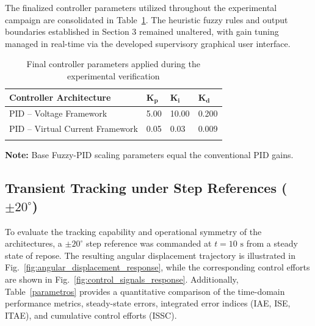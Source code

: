 \documentclass[pdflatex,sn-mathphys-num,iicol]{sn-jnl}
\theoremstyle{thmstyleone}%
\theoremstyle{thmstyletwo}%
\theoremstyle{thmstylethree}%
\begin{document}
The finalized controller parameters utilized throughout the experimental campaign are consolidated in Table~\ref{tab:experimental_gains}. The heuristic fuzzy rules and output boundaries established in Section 3 remained unaltered, with gain tuning managed in real-time via the developed supervisory graphical user interface.
\begin{table}[h]
\caption{Final controller parameters applied during the experimental verification}\label{tab:experimental_gains}%
\begin{center}
\begin{minipage}{\columnwidth}
\footnotesize %
%
\begin{tabular*}{\columnwidth}{@{\extracolsep{\fill}}@{}llll@{}}
\toprule
\textbf{Controller Architecture} & $\mathbf{K_p}$ & $\mathbf{K_i}$ & $\mathbf{K_d}$ \\
\midrule
PID -- Voltage Framework          & 5.00 & 10.00 & 0.200 \\
PID -- Virtual Current Framework  & 0.05 & 0.03  & 0.009 \\
\botrule
\end{tabular*}
\vskip 3pt
\scriptsize\textbf{Note:} Base Fuzzy-PID scaling parameters equal the conventional PID gains.
\end{minipage}
\end{center}
\end{table}


\subsection{Transient Tracking under Step References ($\pm20^\circ$)}
\label{sub:step_tracking}


To evaluate the tracking capability and operational symmetry of the architectures, a $\pm20^\circ$ step reference was commanded at $t = 10\text{ s}$ from a steady state of repose. The resulting angular displacement trajectory is illustrated in Fig.~\ref{fig:angular_displacement_response}, while the corresponding control efforts are shown in Fig.~\ref{fig:control_signals_response}. Additionally, Table~\ref{parametros} provides a quantitative comparison of the time-domain performance metrics, steady-state errors, integrated error indices (IAE, ISE, ITAE), and cumulative control efforts (ISSC).
\end{document}
